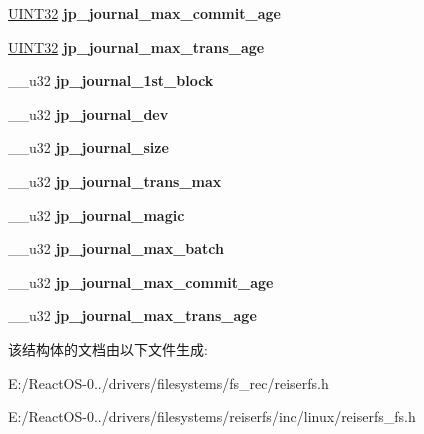 \begin{DoxyCompactItemize}
\hyperlink{_processor_bind_8h_ae1e6edbbc26d6fbc71a90190d0266018}{U\+I\+N\+T32} {\bfseries jp\+\_\+journal\+\_\+max\+\_\+commit\+\_\+age}
\item 
\mbox{\label{structjournal__params_acbcab35d788c565914813411824b0434}} 
\hyperlink{_processor_bind_8h_ae1e6edbbc26d6fbc71a90190d0266018}{U\+I\+N\+T32} {\bfseries jp\+\_\+journal\+\_\+max\+\_\+trans\+\_\+age}
\item 
\mbox{\label{structjournal__params_a1d34edfd91d977866d52e7a166baabd5}} 
\+\_\+\+\_\+u32 {\bfseries jp\+\_\+journal\+\_\+1st\+\_\+block}
\item 
\mbox{\label{structjournal__params_abdd6092589166e3ef31870fdda6f5c72}} 
\+\_\+\+\_\+u32 {\bfseries jp\+\_\+journal\+\_\+dev}
\item 
\mbox{\label{structjournal__params_adf5393f92e0c608ffa2ed62b240a9af5}} 
\+\_\+\+\_\+u32 {\bfseries jp\+\_\+journal\+\_\+size}
\item 
\mbox{\label{structjournal__params_ab9cf9078ada26f582be6fd05f22de63d}} 
\+\_\+\+\_\+u32 {\bfseries jp\+\_\+journal\+\_\+trans\+\_\+max}
\item 
\mbox{\label{structjournal__params_a83af8a356f15b5633cc551bc6044f132}} 
\+\_\+\+\_\+u32 {\bfseries jp\+\_\+journal\+\_\+magic}
\item 
\mbox{\label{structjournal__params_ae0888bfcaad20b1e6015d1b28a11b8cb}} 
\+\_\+\+\_\+u32 {\bfseries jp\+\_\+journal\+\_\+max\+\_\+batch}
\item 
\mbox{\label{structjournal__params_a9568d217308943d8aaac625ca49aa12b}} 
\+\_\+\+\_\+u32 {\bfseries jp\+\_\+journal\+\_\+max\+\_\+commit\+\_\+age}
\item 
\mbox{\label{structjournal__params_acbcab35d788c565914813411824b0434}} 
\+\_\+\+\_\+u32 {\bfseries jp\+\_\+journal\+\_\+max\+\_\+trans\+\_\+age}
\end{DoxyCompactItemize}


该结构体的文档由以下文件生成\+:\begin{DoxyCompactItemize}
\item 
E\+:/\+React\+O\+S-\/0../drivers/filesystems/fs\+\_\+rec/reiserfs.\+h\item 
E\+:/\+React\+O\+S-\/0../drivers/filesystems/reiserfs/inc/linux/reiserfs\+\_\+fs.\+h\end{DoxyCompactItemize}
